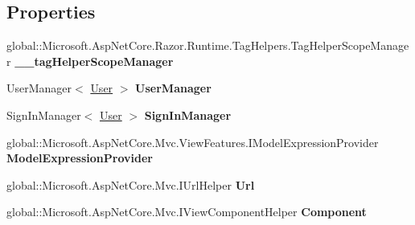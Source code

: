 \subsection*{Properties}
\begin{DoxyCompactItemize}
\item 
\mbox{\label{class_asp_net_core_1_1_views___shared_____layout_ad2d2629975e2e90d6fb45d8e0adcd336}} 
global\+::\+Microsoft.\+Asp\+Net\+Core.\+Razor.\+Runtime.\+Tag\+Helpers.\+Tag\+Helper\+Scope\+Manager {\bfseries \+\_\+\+\_\+tag\+Helper\+Scope\+Manager}
\item 
User\+Manager$<$ \mbox{\hyperlink{class_projeto_e_s_w_1_1_models_1_1_user}{User}} $>$ {\bfseries User\+Manager}
\item 
\mbox{\label{class_asp_net_core_1_1_views___shared_____layout_a8b5c9a2e3ac335d3d1f1f1dea41fca69}} 
Sign\+In\+Manager$<$ \mbox{\hyperlink{class_projeto_e_s_w_1_1_models_1_1_user}{User}} $>$ {\bfseries Sign\+In\+Manager}
\item 
\mbox{\label{class_asp_net_core_1_1_views___shared_____layout_ab1401810a543459356302583c3bcde5e}} 
global\+::\+Microsoft.\+Asp\+Net\+Core.\+Mvc.\+View\+Features.\+I\+Model\+Expression\+Provider {\bfseries Model\+Expression\+Provider}
\item 
\mbox{\label{class_asp_net_core_1_1_views___shared_____layout_a22522c4dc6d9b5a9c7114f5359bc0913}} 
global\+::\+Microsoft.\+Asp\+Net\+Core.\+Mvc.\+I\+Url\+Helper {\bfseries Url}
\item 
\mbox{\label{class_asp_net_core_1_1_views___shared_____layout_a0f446653dbe55599f2aa8c4e90eeafe5}} 
global\+::\+Microsoft.\+Asp\+Net\+Core.\+Mvc.\+I\+View\+Component\+Helper {\bfseries Component}

\end{DoxyCompactItemize}
